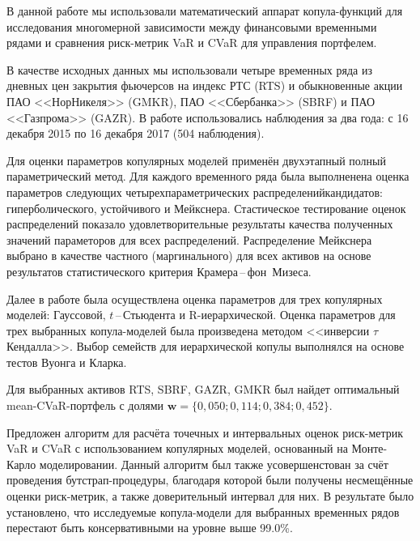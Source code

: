 
В данной работе мы использовали математический аппарат копула-функций для исследования многомерной зависимости между финансовыми временными рядами и сравнения риск-метрик VaR и CVaR для управления портфелем.

В качестве исходных данных мы использовали четыре временных ряда из дневных цен закрытия фьючерсов на индекс РТС (RTS) и обыкновенные акции ПАО <<НорНикеля>> (GMKR), ПАО <<Сбербанка>> (SBRF) и ПАО <<Газпрома>> (GAZR).
В работе использовались наблюдения за два года: с 16 декабря 2015 по 16 декабря 2017 (504 наблюдения).

Для оценки параметров копулярных моделей применён двухэтапный полный параметрический %
метод. %
Для каждого временного ряда была выполненена оценка параметров следующих четырехпараметрических распределений\-кандидатов: гиперболического, устойчивого и Мейкснера.
Стастическое тестирование оценок распределений показало удовлетворительные результаты качества полученных значений параметоров для всех распределений.
Распределение Мейкснера выбрано в качестве частного (маргинального) для всех активов на основе результатов статистического критерия Крамера\,--\,фон~Мизеса.

Далее в работе была осуществлена оценка параметров для трех копулярных моделей: Гауссовой, $t$\,--\,Стьюдента и R-иерархической.
Оценка параметров для трех выбранных копула-моделей была произведена методом <<инверсии $\tau$ Кендалла>>.
Выбор семейств для иерархической копулы выполнялся на основе тестов Вуонга и Кларка.


Для выбранных активов RTS, SBRF, GAZR, GMKR был найдет оптимальный mean-CVaR-портфель с долями $\textbf{w}=\{0,050; 0,114; 0,384; 0,452\}$.

Предложен алгоритм для расчёта точечных и интервальных оценок риск-метрик VaR и CVaR с использованием копулярных моделей, основанный на Монте-Карло моделировании.
Данный алгоритм был также усовершенстован за счёт проведения бутстрап-процедуры, благодаря которой были получены несмещённые оценки риск-метрик, а также доверительный интервал для них.
В результате было установлено, что исследуемые копула-модели для выбранных временных рядов перестают быть консервативными на уровне выше 99.0\%.


